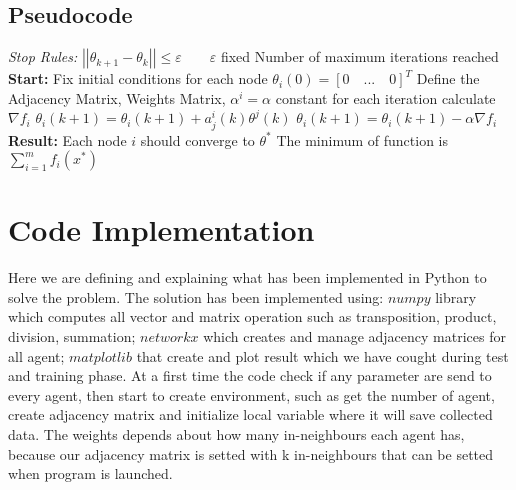 \documentclass[a4paper,11pt,oneside]{book}
\begin{document}
\subsection {Pseudocode} \label{Subsec1.1.3}
\begin{algorithm}
\caption{}
\begin{algorithmic} [1]
\State \textit{Stop Rules:}
\State $\left|\left|\theta_{k+1} - \theta_k\right|\right|  \leq \varepsilon \qquad \varepsilon$ fixed
\State Number of maximum iterations reached
\State \textbf{Start:}
\State Fix initial conditions for each node $\theta_i(0) = [0 \quad ... \quad 0]^T$
\State Define the Adjacency Matrix, Weights Matrix, $\alpha^i = \alpha$ constant for each iteration
    \State calculate $\nabla f_i$
        \State $\theta_i(k+1) = \theta_i(k+1) + a^i_j(k) \theta^j(k)$
    \EndFor
    \State $\theta_i(k+1) = \theta_i(k+1) - \alpha \nabla f_i$
\EndWhile
\State \textbf{Result:}
\State Each node $i$ should converge to $\theta^*$
\State The minimum of function is $\sum \limits_{i=1}^{m}f_i(x^*)$
\end{algorithmic}
\end{algorithm}


\section {Code Implementation} \label{Sec1.2}

Here we are defining and explaining what has been implemented in Python to solve the problem. The solution has been
implemented using: $numpy$ library which computes all vector and matrix operation such as transposition, product, division,
summation; $networkx$ which creates and manage adjacency matrices for all agent; $matplotlib$ that create and plot result
which we have cought during test and training phase. At a first time the code check if any parameter are send to every agent,
then start to create environment, such as get the number of agent, create adjacency matrix and initialize local variable where
it will save collected data. The weights depends about how many in-neighbours each agent has, because our adjacency matrix is
setted with k in-neighbours that can be setted when program is launched. \\
\end{document}
